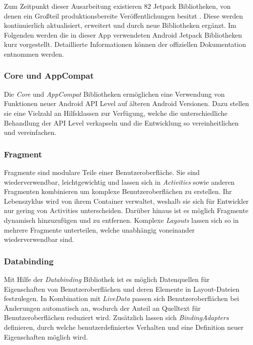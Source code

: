 Zum Zeitpunkt dieser Ausarbeitung existieren 82 Jetpack Bibliotheken, von denen ein Großteil produktionsbereite Veröffentlichungen besitzt \autocite{jetpackcount}.
Diese werden kontinuierlich aktualisiert, erweitert und durch neue Bibliotheken ergänzt.
Im Folgenden werden die in dieser App verwendeten Android Jetpack Bibliotheken kurz vorgestellt. Detaillierte Informationen können der offiziellen Dokumentation entnommen werden.

\subsubsection{Core und AppCompat}
\label{subsubsec:app:jetpack:base}
Die \textit{Core} und \textit{AppCompat} Bibliotheken ermöglichen eine Verwendung von Funktionen neuer Android API Level auf älteren Android Versionen.
Dazu stellen sie eine Vielzahl an Hilfsklassen zur Verfügung, welche die unterschiedliche Behandlung der API Level verkapseln und die Entwicklung so vereinheitlichen und vereinfachen.

\subsubsection{Fragment}
\label{subsubsec:app:jetpack:fragment}
Fragmente sind modulare Teile einer Benutzeroberfläche.
Sie sind wiederverwendbar, leichtgewichtig und lassen sich in \textit{Activities} sowie anderen Fragmenten kombinieren um komplexe Benutzeroberflächen zu erstellen.
Ihr Lebenszyklus wird von ihrem Container verwaltet, weshalb sie sich für Entwickler nur gering von Activities unterscheiden.
Darüber hinaus ist es möglich Fragmente dynamisch hinzuzufügen und zu entfernen.
Komplexe \textit{Layouts} lassen sich so in mehrere Fragmente unterteilen, welche unabhängig voneinander wiederverwendbar sind.

\subsubsection{Databinding}
\label{subsubsec:app:jetpack:databinding}
Mit Hilfe der \textit{Databinding} Bibliothek ist es möglich Datenquellen für Eigenschaften von Benutzeroberflächen und deren Elemente in Layout-Dateien festzulegen.
In Kombination mit \textit{LiveData} passen sich Benutzeroberflächen bei Änderungen automatisch an, wodurch der Anteil an Quelltext für Benutzeroberflächen reduziert wird.
Zusätzlich lassen sich \textit{BindingAdapters} definieren, durch welche benutzerdefiniertes Verhalten und eine Definition neuer Eigenschaften möglich wird.

